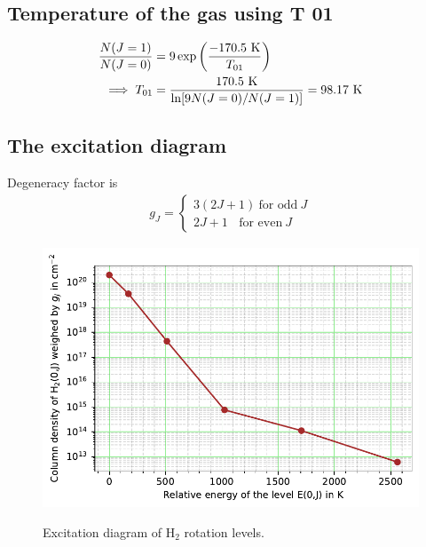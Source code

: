 \documentclass{jhwhw}
\begin{document}
\subsection{Temperature of the gas using T 01}

\begin{align}
\frac{N(J=1)}{N(J=0)} &= 9 \exp \left( \frac{-170.5 ~\rm{K}}{T_{01}} \right)\\
\implies T_{01} &= \frac{170.5 ~\rm{K}}{\ln[9 N(J=0)/N(J=1)]} = 98.17  ~\rm{K}
\end{align}

\subsection{The excitation diagram}

Degeneracy factor is
\begin{align}
g_J = \begin{cases}
3(2J+1) ~ \text{for odd} ~J\\
2J+1 ~~~~\text{for even} ~J
\end{cases}
\end{align}

\begin{figure}[H]
	\centering
	\includegraphics[width=.9\linewidth]{../prob-4-plot-1}
	\label{fig:prob-4-plot-1}
	\caption{Excitation diagram of H$_2$ rotation levels.}
\end{figure}
\end{document}

